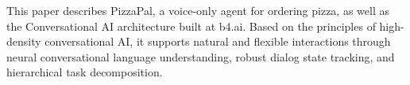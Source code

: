This paper describes PizzaPal, a voice-only agent for ordering pizza, as well as the Conversational AI architecture built at b4.ai. Based on the principles of high-density conversational AI, it supports natural and flexible interactions through neural conversational language understanding, robust dialog state tracking, and hierarchical task decomposition.
